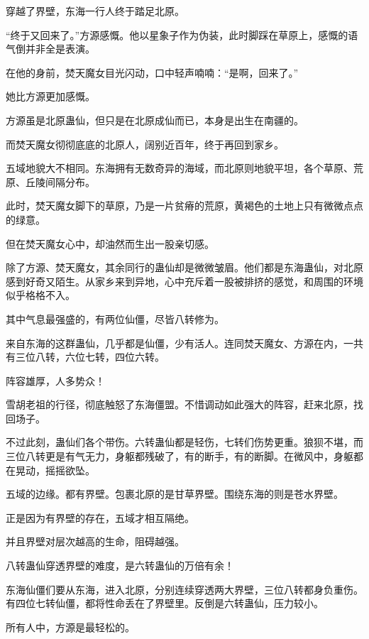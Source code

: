 
\begin{this_body}



穿越了界壁，东海一行人终于踏足北原。

“终于又回来了。”方源感慨。他以星象子作为伪装，此时脚踩在草原上，感慨的语气倒并非全是表演。

在他的身前，焚天魔女目光闪动，口中轻声喃喃：“是啊，回来了。”

她比方源更加感慨。

方源虽是北原蛊仙，但只是在北原成仙而已，本身是出生在南疆的。

而焚天魔女彻彻底底的北原人，阔别近百年，终于再回到家乡。

五域地貌大不相同。东海拥有无数奇异的海域，而北原则地貌平坦，各个草原、荒原、丘陵间隔分布。

此时，焚天魔女脚下的草原，乃是一片贫瘠的荒原，黄褐色的土地上只有微微点点的绿意。

但在焚天魔女心中，却油然而生出一股亲切感。

除了方源、焚天魔女，其余同行的蛊仙却是微微皱眉。他们都是东海蛊仙，对北原感到好奇又陌生。从家乡来到异地，心中充斥着一股被排挤的感觉，和周围的环境似乎格格不入。

其中气息最强盛的，有两位仙僵，尽皆八转修为。

来自东海的这群蛊仙，几乎都是仙僵，少有活人。连同焚天魔女、方源在内，一共有三位八转，六位七转，四位六转。

阵容雄厚，人多势众！

雪胡老祖的行径，彻底触怒了东海僵盟。不惜调动如此强大的阵容，赶来北原，找回场子。

不过此刻，蛊仙们各个带伤。六转蛊仙都是轻伤，七转们伤势更重。狼狈不堪，而三位八转更是有气无力，身躯都残破了，有的断手，有的断脚。在微风中，身躯都在晃动，摇摇欲坠。

五域的边缘。都有界壁。包裹北原的是甘草界壁。围绕东海的则是苍水界壁。

正是因为有界壁的存在，五域才相互隔绝。

并且界壁对层次越高的生命，阻碍越强。

八转蛊仙穿透界壁的难度，是六转蛊仙的万倍有余！

东海仙僵们要从东海，进入北原，分别连续穿透两大界壁，三位八转都身负重伤。有四位七转仙僵，都将性命丢在了界壁里。反倒是六转蛊仙，压力较小。

所有人中，方源是最轻松的。


\end{this_body}
